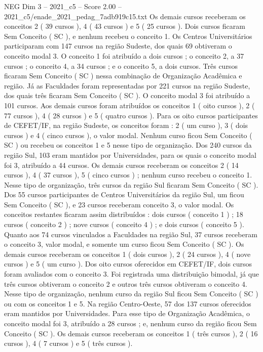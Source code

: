 \begin{textsample}{NEG Dim 3 – 2021\_c5 – Score 2.00 – 2021\_c5/enade\_2021\_pedag\_7adb919c15.txt}
Os demais cursos receberam os conceitos 2 ( 39 cursos ), 4 ( 43 cursos ) e 5 ( 25 cursos ).
Dois cursos ficaram Sem Conceito ( SC ), e nenhum recebeu o conceito 1.
Os Centros Universitários participaram com 147 cursos na região Sudeste, dos quais 69 obtiveram o conceito modal 3.
O conceito 1 foi atribuído a dois cursos ; o conceito 2, a 37 cursos ; o conceito 4, a 34 cursos ; e o conceito 5, a dois cursos.
Três cursos ficaram Sem Conceito ( SC ) nessa combinação de Organização Acadêmica e região.
Já as Faculdades foram representadas por 221 cursos na região Sudeste, dos quais três ficaram Sem Conceito ( SC ).
O conceito modal 3 foi atribuído a 101 cursos.
Aos demais cursos foram atribuídos os conceitos 1 ( oito cursos ), 2 ( 77 cursos ), 4 ( 28 cursos ) e 5 ( quatro cursos ).
Para os oito cursos participantes de CEFET/IF, na região Sudeste, os conceitos foram : 2 ( um curso ), 3 ( dois cursos ) e 4 ( cinco cursos ), o valor modal.
Nenhum curso ficou Sem Conceito ( SC ) ou recebeu os conceitos 1 e 5 nesse tipo de organização.
Dos 240 cursos da região Sul, 103 eram mantidos por Universidades, para os quais o conceito modal foi 3, atribuído a 44 cursos.
Os demais cursos receberam os conceitos 2 ( 14 cursos ), 4 ( 37 cursos ), 5 ( cinco cursos ) ; nenhum curso recebeu o conceito 1.
Nesse tipo de organização, três cursos da região Sul ficaram Sem Conceito ( SC ).
Dos 55 cursos participantes de Centros Universitários da região Sul, um ficou Sem Conceito ( SC ), e 23 cursos receberam conceito 3, o valor modal.
Os conceitos restantes ficaram assim distribuídos : dois cursos ( conceito 1 ) ; 18 cursos ( conceito 2 ) ; nove cursos ( conceito 4 ) ; e dois cursos ( conceito 5 ).
Quanto aos 74 cursos vinculados a Faculdades na região Sul, 37 cursos receberam o conceito 3, valor modal, e somente um curso ficou Sem Conceito ( SC ).
Os demais cursos receberam os conceitos 1 ( dois cursos ), 2 ( 24 cursos ), 4 ( nove cursos ) e 5 ( um curso ).
Dos oito cursos oferecidos em CEFET/IF, dois cursos foram avaliados com o conceito 3.
Foi registrada uma distribuição bimodal, já que três cursos obtiveram o conceito 2 e outros três cursos obtiveram o conceito 4.
Nesse tipo de organização, nenhum curso da região Sul ficou Sem Conceito ( SC ) ou com os conceitos 1 e 5.
Na região Centro-Oeste, 57 dos 137 cursos oferecidos eram mantidos por Universidades.
Para esse tipo de Organização Acadêmica, o conceito modal foi 3, atribuído a 28 cursos ; e, nenhum curso da região ficou Sem Conceito ( SC ).
Os demais cursos receberam os conceitos 1 ( três cursos ), 2 ( 16 cursos ), 4 ( 7 cursos ) e 5 ( três cursos ).

\end{textsample}
